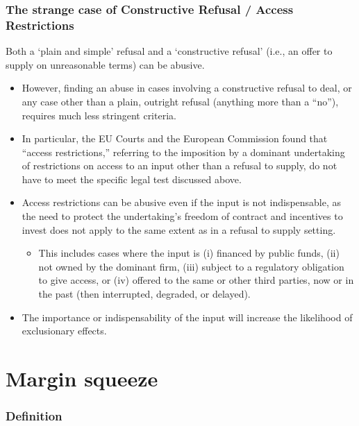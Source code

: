 \newpage
        \subsubsection{The strange case of Constructive Refusal / Access Restrictions}

        Both a ‘plain and simple’ refusal and a ‘constructive refusal’ (i.e., an offer to supply on unreasonable terms) can be abusive.

        \begin{itemize}
            \item However, finding an abuse in cases involving a constructive refusal to deal, or any case other than a plain, outright refusal (anything more than a “no”), requires much less stringent criteria.
            \item In particular, the EU Courts and the European Commission found that “access restrictions,” referring to the imposition by a dominant undertaking of restrictions on access to an input other than a refusal to supply, do not have to meet the specific legal test discussed above.
            \item Access restrictions can be abusive even if the input is not indispensable, as the need to protect the undertaking’s freedom of contract and incentives to invest does not apply to the same extent as in a refusal to supply setting.
            \begin{itemize}
                \item This includes cases where the input is (i) financed by public funds, (ii) not owned by the dominant firm, (iii) subject to a regulatory obligation to give access, or (iv) offered to the same or other third parties, now or in the past (then interrupted, degraded, or delayed).
            \end{itemize}
            \item The importance or indispensability of the input will increase the likelihood of exclusionary effects.
        \end{itemize}

\section{Margin squeeze}

        \subsubsection{Definition}

